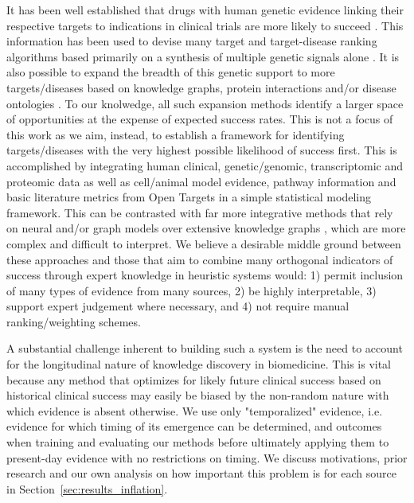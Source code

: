\documentclass{article}
\begin{document}
It has been well established that drugs with human genetic evidence linking their respective targets to indications in clinical trials are more likely to succeed \cite{Nelson2015-eg,King2019-rc,Minikel2023.06.23.23291765,Razuvayevskaya2023.02.07.23285407,PMID:30652614,PMID:24833294,PMID:35804044,PMID:36963162}. This information has been used to devise many target and target-disease ranking algorithms based primarily on a synthesis of multiple genetic signals alone \cite{PMID:38172303,Koscielny2017-rr,PMID:31253980}. It is also possible to expand the breadth of this genetic support to more targets/diseases based on knowledge graphs, protein interactions and/or disease ontologies \cite{PMID:33262371,Bao2022-bq,Sadler2023-xd,PMID:36087372,PMID:36823319}. To our knolwedge, all such expansion methods identify a larger space of opportunities at the expense of expected success rates. This is not a focus of this work as we aim, instead, to establish a framework for identifying targets/diseases with the very highest possible likelihood of success first. This is accomplished by integrating human clinical, genetic/genomic, transcriptomic and proteomic data as well as cell/animal model evidence, pathway information and basic literature metrics from Open Targets \cite{Koscielny2017-rr} in a simple statistical modeling framework. This can be contrasted with far more integrative methods that rely on neural and/or graph models over extensive knowledge graphs \cite{Paliwal2020-hr,PMID:33741907,pittala2020relationweighted,PMID:32750869}, which are more complex and difficult to interpret. We believe a desirable middle ground between these approaches and those that aim to combine many orthogonal indicators of success through expert knowledge in heuristic systems \cite{PMID:38404138,Koscielny2017-rr} would: 1) permit inclusion of many types of evidence from many sources, 2) be highly interpretable, 3) support expert judgement where necessary, and 4) not require manual ranking/weighting schemes.

A substantial challenge inherent to building such a system is the need to account for the longitudinal nature of knowledge discovery in biomedicine. This is vital because any method that optimizes for likely future clinical success based on historical clinical success may easily be biased by the non-random nature with which evidence is absent otherwise. We use only "temporalized" evidence, i.e. evidence for which timing of its emergence can be determined, and outcomes when training and evaluating our methods before ultimately applying them to present-day evidence with no restrictions on timing. We discuss motivations, prior research and our own analysis on how important this problem is for each source in Section~\ref{sec:results_inflation}.
\end{document}

